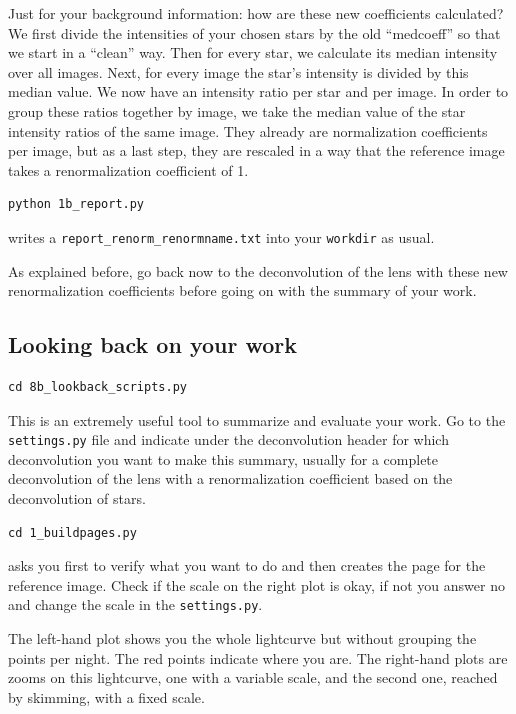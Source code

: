 Just for your background information: how are these new coefficients calculated?
We first divide the intensities of your chosen stars by the old ``medcoeff'' so that we start in a ``clean'' way. Then for every star, we calculate its median intensity over all images. Next, for every image the star's intensity is divided by this median value. We now have an intensity ratio per star and per image. In order to group these ratios together by image, we take the median value of the star intensity ratios of the same image. They already are normalization coefficients per image, but as a last step, they are rescaled in a way that the reference image takes a renormalization coefficient of 1.

\begin{Verbatim}
python 1b_report.py
\end{Verbatim}
writes a \verb+report_renorm_renormname.txt+ into your \verb+workdir+ as usual.

As explained before, go back now to the deconvolution of the lens with these new renormalization coefficients before going on with the summary of your work.

\subsection{Looking back on your work}

\begin{Verbatim}
cd 8b_lookback_scripts.py
\end{Verbatim}
This is an extremely useful tool to summarize and evaluate your work. Go to the \verb+settings.py+ file and indicate under the deconvolution header for which deconvolution you want to make this summary, usually for a complete deconvolution of the lens with a renormalization coefficient based on the deconvolution of stars. 

\begin{Verbatim}
cd 1_buildpages.py
\end{Verbatim}
asks you first to verify what you want to do and then creates the page for the reference image. Check if the scale on the right plot is okay, if not you answer no and change the scale in the \verb+settings.py+. 

The left-hand plot shows you the whole lightcurve but without grouping the points per night. The red points indicate where you are. The right-hand plots are zooms on this lightcurve, one with a variable scale, and the second one, reached by skimming, with a fixed scale.


